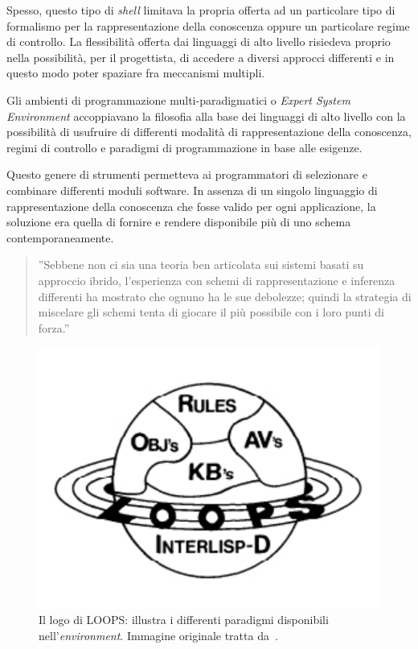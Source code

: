 Spesso, questo tipo di \emph{shell} limitava la propria offerta ad un particolare tipo di formalismo per la rappresentazione della conoscenza oppure un particolare regime di controllo. La flessibilità offerta dai linguaggi di alto livello risiedeva proprio nella possibilità, per il progettista, di accedere a diversi approcci differenti e in questo modo poter spaziare fra meccanismi multipli.

Gli ambienti di programmazione multi-paradigmatici o \emph{Expert System Environment} accoppiavano la filosofia alla base dei linguaggi di alto livello con la possibilità di usufruire di differenti modalità di rappresentazione della conoscenza, regimi di controllo e paradigmi di programmazione in base alle esigenze.

Questo genere di strumenti permetteva ai programmatori di selezionare e combinare differenti moduli software. In assenza di un singolo linguaggio di rappresentazione della conoscenza che fosse valido per ogni applicazione, la soluzione era quella di fornire e rendere disponibile più di uno schema contemporaneamente.

\begin{quote}
''Sebbene non ci sia una teoria ben articolata sui sistemi basati su approccio ibrido, l'esperienza con schemi di rappresentazione e inferenza differenti ha mostrato che ognuno ha le sue debolezze; quindi la strategia di miscelare gli schemi tenta di giocare il più possibile con i loro punti di forza.''~\cite{jackson1999}
\end{quote}

\begin{figure}[h]
\centering
\includegraphics[scale=0.7, viewport=0 0 272 184]{Immagini/Capitolo1/LOOPS-logo.pdf}
\caption[Il logo di LOOPS]{Il logo di LOOPS: illustra i differenti paradigmi disponibili nell'\emph{environment}. Immagine originale tratta da~\cite{loops1983aaai}.}\label{fig:logo-LOOPS}
\end{figure}

